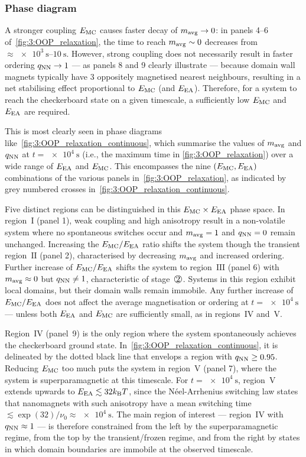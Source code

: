 \subsubsection{Phase diagram}
A stronger coupling $E_\mathrm{MC}$ causes faster decay of $m_\mathrm{avg} \rightarrow 0$: in panels 4--6 of~\cref{fig:3:OOP_relaxation}, the time to reach $m_\mathrm{avg} \sim 0$ decreases from $\approx \SIrange{e3}{10}{\second}$.
However, strong coupling does not necessarily result in faster ordering $q_\mathrm{NN} \rightarrow 1$ --- as panels 8 and 9 clearly illustrate --- because domain wall magnets typically have 3 oppositely magnetised nearest neighbours, resulting in a net stabilising effect proportional to $E_\mathrm{MC}$ (and $E_\mathrm{EA}$).
Therefore, for a system to reach the checkerboard state on a given timescale, a sufficiently low $E_\mathrm{MC}$ and $E_\mathrm{EA}$ are required. \par
This is most clearly seen in phase diagrams like~\cref{fig:3:OOP_relaxation_continuous}, which summarise the values of $m_\mathrm{avg}$ and $q_\mathrm{NN}$ at $t = \SI{e4}{\second}$ (i.e., the maximum time in \cref{fig:3:OOP_relaxation}) over a wide range of $E_\mathrm{EA}$ and $E_\mathrm{MC}$.
This encompasses the nine $(E_\mathrm{MC},E_\mathrm{EA})$ combinations of the various panels in~\cref{fig:3:OOP_relaxation}, as indicated by grey numbered crosses in~\cref{fig:3:OOP_relaxation_continuous}. \par
Five distinct regions can be distinguished in this $E_\mathrm{MC} \times E_\mathrm{EA}$ phase space.
In region~$\mathrm{I}$ (panel 1), weak coupling and high anisotropy result in a non-volatile system where no spontaneous switches occur and $m_\mathrm{avg} = 1$ and $q_\mathrm{NN} = 0$ remain unchanged.
Increasing the $E_\mathrm{MC}/E_\mathrm{EA}$ ratio shifts the system though the transient region~$\mathrm{II}$ (panel 2), characterised by decreasing $m_\mathrm{avg}$ and increased ordering.
Further increase of $E_\mathrm{MC}/E_\mathrm{EA}$ shifts the system to region~$\mathrm{III}$ (panel 6) with $m_\mathrm{avg} \approx 0$ but $q_\mathrm{NN} \neq 1$, characteristic of stage~$\circled{2}$.
Systems in this region exhibit local domains, but their domain walls remain immobile.
Any further increase of $E_\mathrm{MC}/E_\mathrm{EA}$ does not affect the average magnetisation or ordering at $t = \SI{e4}{\second}$ --- unless both $E_\mathrm{EA}$ and $E_\mathrm{MC}$ are sufficiently small, as in regions~$\mathrm{IV}$ and~$\mathrm{V}$. \par
Region~$\mathrm{IV}$ (panel~9) is the only region where the system spontaneously achieves the checkerboard ground state.
In~\cref{fig:3:OOP_relaxation_continuous}, it is delineated by the dotted black line that envelops a region with $q_\mathrm{NN} \geq 0.95$.
Reducing $E_\mathrm{MC}$ too much puts the system in region~$\mathrm{V}$ (panel 7), where the system is superparamagnetic at this timescale.
For $t = \SI{e4}{\second}$, region~$\mathrm{V}$ extends upwards to $\EEA \lesssim 32 \kBT$, since the N\'eel-Arrhenius switching law states that nanomagnets with such anisotropy have a mean switching time $\lesssim \exp(32)/\nu_0 \approx \SI{e4}{\second}$.
The main region of interest --- region~$\mathrm{IV}$ with $q_\mathrm{NN} \approx 1$ --- is therefore constrained from the left by the superparamagnetic regime, from the top by the transient/frozen regime, and from the right by states in which domain boundaries are immobile at the observed timescale.

